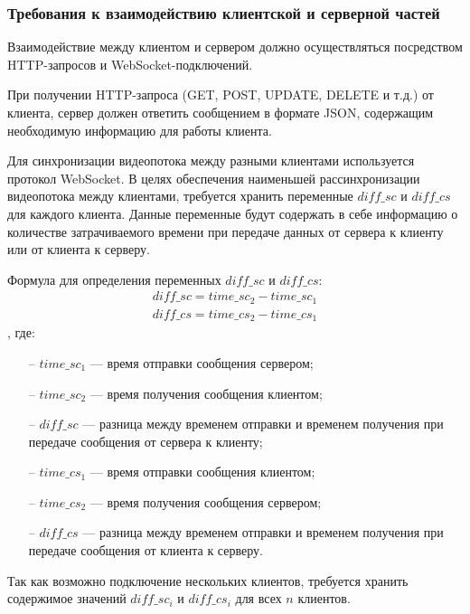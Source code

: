 \newpage

\subsubsection{Требования к взаимодействию клиентской и серверной частей}
Взаимодействие между клиентом и сервером должно осуществляться посредством HTTP-запросов и WebSocket-подключений.

При получении HTTP-запроса (GET, POST, UPDATE, DELETE и т.д.) от клиента, сервер должен ответить сообщением в формате
JSON, содержащим необходимую информацию для работы клиента.

Для синхронизации видеопотока между разными клиентами используется протокол WebSocket.
В целях обеспечения наименьшей рассинхронизации видеопотока между клиентами, требуется хранить переменные \(diff\_sc\) и \(diff\_cs\) для
каждого клиента.
Данные переменные будут содержать в себе информацию о количестве затрачиваемого времени при передаче данных от сервера к клиенту или от клиента к серверу.

Формула для определения переменных \(diff\_sc\) и \(diff\_cs\): \begin{gather*}
                                                                    diff\_sc = time\_sc_2 - time\_sc_1\\
                                                                    diff\_cs = time\_cs_2 - time\_cs_1
\end{gather*}, где:
\begin{itemize}[noitemsep]
    \item[--] \(time\_sc_1\) — время отправки сообщения сервером;
    \item[--] \(time\_sc_2\) — время получения сообщения клиентом;
    \item[--] \(diff\_sc\) — разница между временем отправки и временем получения при передаче сообщения от сервера к клиенту;
    \item[--] \(time\_cs_1\) — время отправки сообщения клиентом;
    \item[--] \(time\_cs_2\) — время получения сообщения сервером;
    \item[--] \(diff\_cs\) — разница между временем отправки и временем получения при передаче сообщения от клиента к серверу.
\end{itemize}

Так как возможно подключение нескольких клиентов, требуется хранить содержимое значений \(diff\_sc_i\) и \(diff\_cs_i\) для всех \(n\) клиентов.

